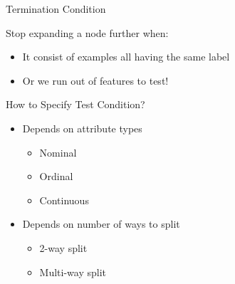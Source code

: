 \documentclass{beamer}
\begin{document}
\begin{frame}{Termination Condition}

    Stop expanding a node further when: \pause
    \begin{itemize}
        \item It consist of examples all having the same label 
        \item Or we run out of features to test!
    \end{itemize}
\end{frame}


\begin{frame}{How to Specify Test Condition?}
    \begin{itemize}
        \item Depends on attribute types
        \begin{itemize}
            \item Nominal
            \item Ordinal
            \item Continuous
        \end{itemize}
        \item Depends on number of ways to split
        \begin{itemize}
            \item 2-way split
            \item Multi-way split
        \end{itemize}
    \end{itemize}
\end{frame}
\end{document}
